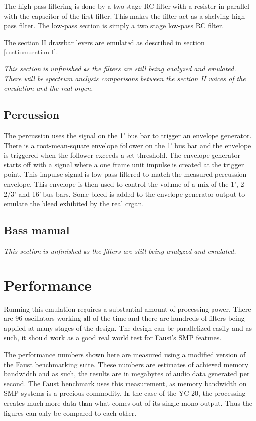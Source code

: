 \documentclass[11pt,a4paper]{article}
\begin{document}
The high pass filtering is done by a two stage RC filter with a resistor in parallel with the capacitor of the first filter. This makes the filter act as a shelving high pass filter. The low-pass section is simply a two stage low-pass RC filter.

The section II drawbar levers are emulated as described in section \ref{section:section-I}.

\emph{This section is unfinished as the filters are still being analyzed and emulated. There will be spectrum analysis comparisons between the section II voices of the emulation and the real organ.}


\subsection{Percussion}

The percussion uses the signal on the 1' bus bar to trigger an envelope generator. There is a root-mean-square envelope follower on the 1' bus bar and the envelope is triggered when the follower exceeds a set threshold. The envelope generator starts off with a signal where a one frame unit impulse is created at the trigger point. This impulse signal is low-pass filtered to match the measured percussion envelope. This envelope is then used to control the volume of a mix of the 1', 2-2/3' and 16' bus bars. Some bleed is added to the envelope generator output to emulate the bleed exhibited by the real organ.

\subsection{Bass manual}

\emph{This section is unfinished as the filters are still being analyzed and emulated.}

\section{Performance}
\label{section:performance}

Running this emulation requires a substantial amount of processing power. There are 96 oscillators working all of the time and there are hundreds of filters being applied at many stages of the design. The design can be parallelized easily and as such, it should work as a good real world test for Faust's SMP features.

The performance numbers shown here are measured using a modified version of the Faust benchmarking suite. These numbers are estimates of achieved memory bandwidth and as such, the results are in megabytes of audio data generated per second. The Faust benchmark uses this measurement, as memory bandwidth on SMP systems is a precious commodity. In the case of the YC-20, the processing creates much more data than what comes out of its single mono output. Thus the figures can only be compared to each other.
\end{document}
